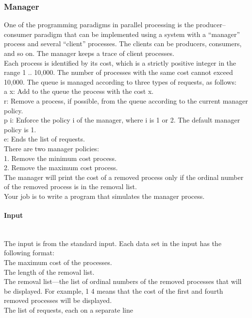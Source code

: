 \documentclass{article}
\begin{document}

\subsubsection{Manager}
One of the programming paradigms in parallel processing is the producer–consumer paradigm
that can be implemented using a system with a “manager” process and several “client” processes.
The clients can be producers, consumers, and so on. The manager keeps a trace of client processes. \\
Each process is identified by its cost, which is a strictly positive integer in the range 1 .. 10,000.
The number of processes with the same cost cannot exceed 10,000. The queue is managed according to three types of requests, as follows:\\

a x: Add to the queue the process with the cost x.\\
r: Remove a process, if possible, from the queue according to the current manager policy.\\
p i: Enforce the policy i of the manager, where i is 1 or 2. The default manager policy is 1.\\
e: Ends the list of requests.\\

There are two manager policies:\\

1. Remove the minimum cost process.\\
2. Remove the maximum cost process. \\

The manager will print the cost of a removed process only if the ordinal number of the removed
process is in the removal list.\\
Your job is to write a program that simulates the manager process.

\paragraph{Input} \mbox{} \\

The input is from the standard input. Each data set in the input has the following format:\\

The maximum cost of the processes.\\
The length of the removal list.\\
The removal list—the list of ordinal numbers of the removed processes that will be displayed. For example, 1 4 means that the cost of the first and fourth removed processes will
be displayed.\\
The list of requests, each on a separate line\\
\end{document}
